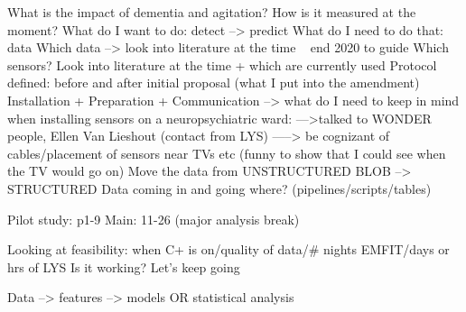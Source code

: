 

What is the impact of dementia and agitation?
How is it measured at the moment?
What do I want to do: detect --> predict
What do I need to do that: data
Which data --> look into literature at the time ~ end 2020 to guide
Which sensors? Look into literature at the time + which are currently used
Protocol defined: before and after initial proposal (what I put into the amendment)
Installation + Preparation + Communication
--> what do I need to keep in mind when installing sensors on a neuropsychiatric ward:
--->talked to WONDER people, Ellen Van Lieshout (contact from LYS)
-----> be cognizant of cables/placement of sensors near TVs etc (funny to show that I could see when the TV would go on)
Move the data from UNSTRUCTURED BLOB --> STRUCTURED
Data coming in and going where? (pipelines/scripts/tables)

Pilot study: p1-9
Main: 11-26 (major analysis break)

Looking at feasibility: when C+ is on/quality of data/# nights EMFIT/days or hrs of LYS
Is it working? Let's keep going 

Data --> features --> models OR statistical analysis
